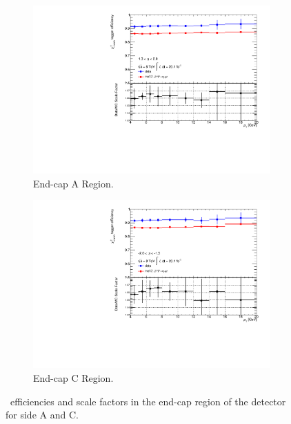 \begin{figure}[htbp]
  \centering
  \begin{subfigure}[b]{0.85\textwidth}
    \includegraphics[width=\textwidth]{PartCalibration2012/Plots/SFPlots/Endcap_A_smt.pdf}
    \caption{End-cap A Region.}\label{fig:CalibrationScaleFactorEndcapA}
  \end{subfigure}
  
  \begin{subfigure}[b]{0.85\textwidth}
    \includegraphics[width=\textwidth]{PartCalibration2012/Plots/SFPlots/Endcap_C_smt.pdf}
    \caption{End-cap C Region.}\label{fig:CalibrationScaleFactorEndcapC}
  \end{subfigure}
  \caption[\xsm\ efficiencies and scale factors in the end-cap region of the detector for side A and C.]{\xsm\ efficiencies and scale factors in the end-cap region of the detector for side  A and  C.}\label{fig:CalibrationScaleFactorEndcap}
\end{figure}

